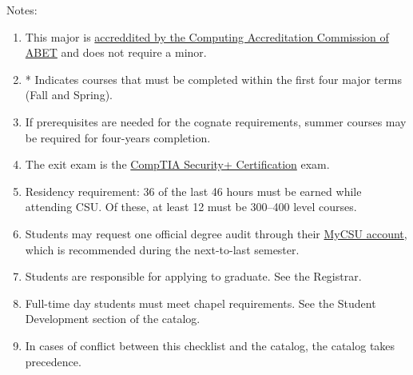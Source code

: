 Notes:%
\begin{enumerate}\footnotesize
	\item This major is
		\href{https://www.abet.org/accreditation/what-is-accreditation/why-abet-accreditation-matters/}{accreddited by the Computing Accreditation Commission of ABET} and does not require a minor.
	\item * Indicates courses that must be completed within the first four major terms (Fall and Spring).
	\item If prerequisites are needed for the cognate requirements, summer courses may be required for four-years completion.
	\item The exit exam is the \href{https://www.comptia.org/certifications/security}{CompTIA Security+ Certification} exam.
	\item Residency requirement: 36 of the last 46 hours must be earned while attending CSU. Of these, at least 12 must be 300--400 level courses.
	\item Students may request one official degree audit through their \href{https://portal.csuniv.edu/}{MyCSU account}, which is recommended during the next-to-last semester.
	\item Students are responsible for applying to graduate. See the Registrar.
	\item Full-time day students must meet chapel requirements. See the Student Development section of the catalog.
	\item In cases of conflict between this checklist and the catalog, the catalog takes precedence.
\end{enumerate}